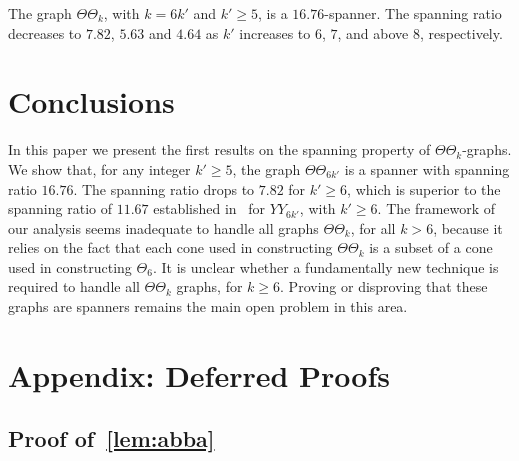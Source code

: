 \documentclass[runningheads,a4paper]{llncs}
\begin{document}
\begin{theorem} 
\label{thm:main}
The graph $\Theta\Theta_k$, with $k = 6k'$ and $k' \ge 5$, is a $16.76$-spanner. The spanning ratio decreases to $7.82$, $5.63$ and $4.64$ as $k'$ increases to $6$, $7$, and above $8$, respectively.
\end{theorem}

\section{Conclusions}
In this paper we present the first results on the spanning property of $\Theta\Theta_k$-graphs. We show that, for any integer $k' \ge 5$, the graph $\Theta\Theta_{6k'}$ is a spanner with spanning ratio $16.76$. The spanning ratio drops to $7.82$ for $k' \ge 6$, which is superior to the spanning ratio of $11.67$ established in~\cite{jDR12} for $YY_{6k'}$, with $k' \ge 6$. The framework of our analysis seems inadequate to handle all graphs $\Theta\Theta_k$, for all $k>6$, because it relies on the fact that each cone used in constructing $\Theta\Theta_k$ is a subset of a cone used in constructing $\Theta_6$. 
It is unclear whether a fundamentally new technique is  required to handle all $\Theta\Theta_k$ graphs, for $k \ge 6$. Proving or disproving that these graphs are spanners remains the main open problem in this area. 






\newpage
\section*{Appendix: Deferred Proofs}
\label{sec:defer}



\subsection{Proof of~\autoref{lem:abba}}
\end{document}
